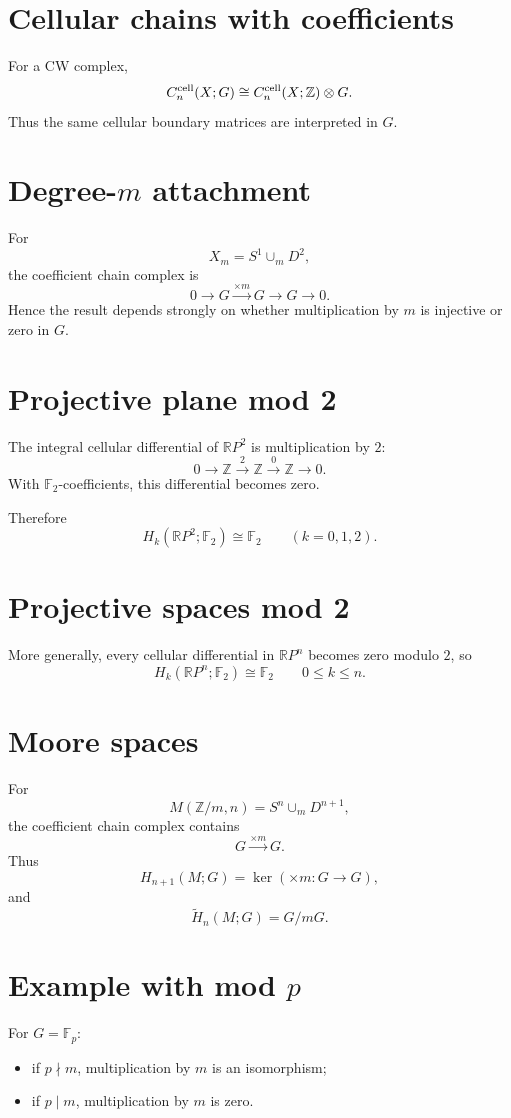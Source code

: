 \section{Cellular chains with coefficients}
For a CW complex,
\[
C_n^{\rm cell}(X;G)
\cong
C_n^{\rm cell}(X;\mathbb Z)\otimes G.
\]
Thus the same cellular boundary matrices are interpreted in \(G\).

\section{Degree-\(m\) attachment}
For
\[
X_m=S^1\cup_mD^2,
\]
the coefficient chain complex is
\[
0\to G\xrightarrow{\times m}G\to G\to0.
\]
Hence the result depends strongly on whether multiplication by \(m\) is
injective or zero in \(G\).

\section{Projective plane mod 2}
The integral cellular differential of \(\mathbb RP^2\) is multiplication by
\(2\):
\[
0\to\mathbb Z\xrightarrow{2}\mathbb Z\xrightarrow0\mathbb Z\to0.
\]
With \(\mathbb F_2\)-coefficients, this differential becomes zero.

Therefore
\[
H_k(\mathbb RP^2;\mathbb F_2)\cong\mathbb F_2
\qquad
(k=0,1,2).
\]

\section{Projective spaces mod 2}
More generally, every cellular differential in \(\mathbb RP^n\) becomes zero
modulo \(2\), so
\[
H_k(\mathbb RP^n;\mathbb F_2)\cong\mathbb F_2
\qquad
0\le k\le n.
\]

\section{Moore spaces}
For
\[
M(\mathbb Z/m,n)=S^n\cup_mD^{n+1},
\]
the coefficient chain complex contains
\[
G\xrightarrow{\times m}G.
\]
Thus
\[
H_{n+1}(M;G)=\ker(\times m:G\to G),
\]
and
\[
\widetilde H_n(M;G)=G/mG.
\]

\section{Example with mod \(p\)}
For \(G=\mathbb F_p\):
\begin{itemize}
\item if \(p\nmid m\), multiplication by \(m\) is an isomorphism;
\item if \(p\mid m\), multiplication by \(m\) is zero.
\end{itemize}

